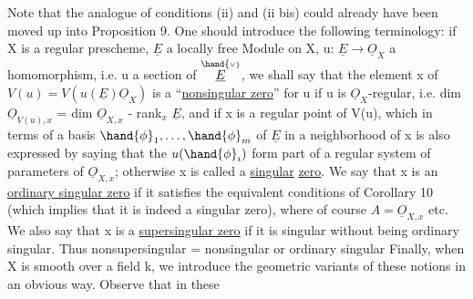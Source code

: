  Note that the analogue of conditions (ii) and (ii bis) could already
have been moved up into Proposition 9. One should introduce the following terminology:
if X is a regular prescheme, $\underline{E}$ a locally free Module
 on X, u: $\underline{E}\to\underline{O}_X$ a homomorphism, i.e. u a section of
$\overset{\hand{\scriptscriptstyle\vee}}{\underline{E}}$, we shall say that the element x of $V(u)=V(u(\underline{E})\underline{O}_X)$ is a 
``\uline{nonsingular zero}'' for u\hand{,} if u is $\underline{O}_X$-regular, i.e. dim $\underline{O}_{V(u),x}$
= dim $\underline{O}_{X,x}$ - rank$_x$ $\underline{E}$, and if  x is a regular point of V(u),
which in terms of a basis $\hand{\phi}_1,\ldots,\hand{\phi}_m$ of $\underline{E}$ in a neighborhood of x is
also expressed by saying that the $u(\hand{\phi}_i)$ form part of a regular system
of parameters of $\underline{O}_{X,x}$; otherwise x is called a \uline{singular}
\uline{zero}. We say that x is an \uline{ordinary singular zero} if it satisfies
the equivalent conditions of Corollary 10 (which implies that it is
indeed a singular zero), where of course $A=\underline{O}_{X,x}$ etc. We also say that
x is a \uline{supersingular zero} if it is singular without being ordinary
singular. Thus nonsupersingular = nonsingular or ordinary singular
Finally, when X is smooth over a field k, we introduce the geometric variants
of these notions in an obvious way. Observe that in these

